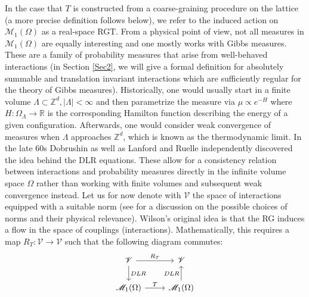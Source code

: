 \documentclass{article}
\begin{document}
In the case that $T$ is constructed from a coarse-graining procedure on the lattice (a more precise definition follows below), we refer to the induced action on $\mathscr{M}_1(\Omega)$ as a real-space RGT. From a physical point of view, not all measures in $\mathscr{M}_1(\Omega)$ are equally interesting and one mostly works with Gibbs measures. These are a family of probability measures that arise from well-behaved interactions (in Section \ref{Sec2}, we will give a formal definition for absolutely summable and translation invariant interactions which are sufficiently regular for the theory of Gibbs measures). Historically, one would usually start in a finite volume $\Lambda\subset\mathds{Z}^d,|\Lambda|<\infty$ and then parametrize the measure via $\mu\propto e^{-H}$ where $H:\Omega_\Lambda\to\mathds{R}$ is the corresponding Hamilton function describing the energy of a given configuration. Afterwards, one would consider weak convergence of measures when $\Lambda$ approaches $\mathds{Z}^d$, which is known as the thermodynamic limit. In the late 60s Dobrushin \cite{doi:10.1137/1113026} as well as Lanford and Ruelle \cite{Lanford1969} independently discovered the idea behind the DLR equations. These allow for a consistency relation between interactions and probability measures directly in the infinite volume space $\Omega$ rather than working with finite volumes and subsequent weak convergence instead. Let us for now denote with $\mathscr{V}$ the space of interactions equipped with a suitable norm (see \cite{van_Enter_1993} for a discussion on the possible choices of norms and their physical relevance). Wilson's original idea is that the RG induces a flow in the space of couplings (interactions). Mathematically, this requires a map $R_T:\mathscr{V}\to\mathscr{V}$ such that the following diagram commutes:
\[
\begin{tikzcd}
\mathscr{V} \arrow[r, "R_T"] \arrow[d, "DLR"] & \mathscr{V}  \\
\mathscr{M}_1(\Omega) \arrow[r, "T"]                 & \mathscr{M}_1(\Omega) \arrow[u, "DLR"]
\end{tikzcd}
\]
\end{document}
